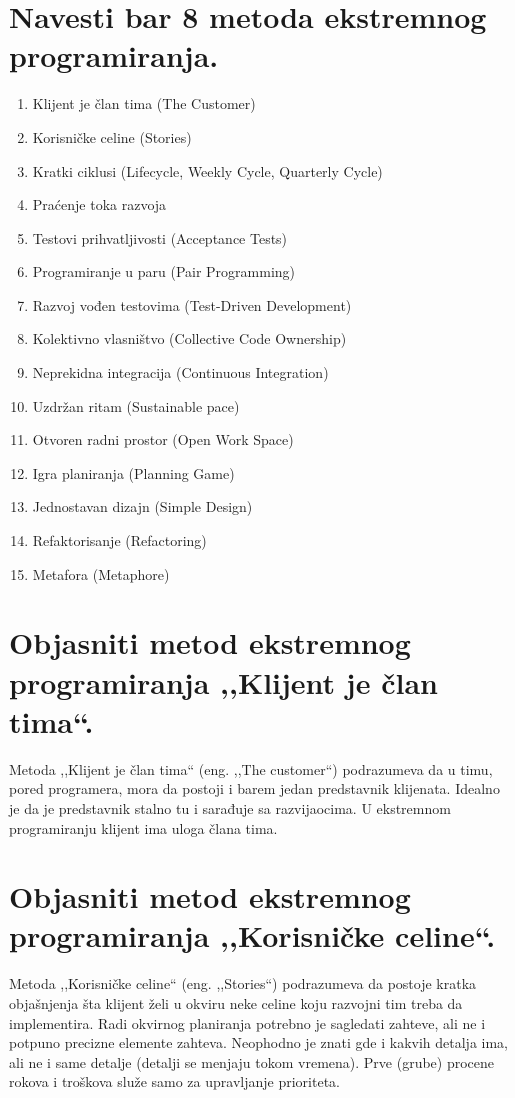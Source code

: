 \documentclass[a4paper]{article}
\begin{document}
\section{Navesti bar 8 metoda ekstremnog programiranja.}
  \begin{enumerate}
    \item Klijent je član tima (The Customer)
    \item Korisničke celine (Stories)
    \item Kratki ciklusi (Lifecycle, Weekly Cycle, Quarterly Cycle)
    \item Praćenje toka razvoja
    \item Testovi prihvatljivosti (Acceptance Tests)
    \item Programiranje u paru (Pair Programming)
    \item Razvoj vođen testovima (Test-Driven Development)
    \item Kolektivno vlasništvo (Collective Code Ownership)
    \item Neprekidna integracija (Continuous Integration)
    \item Uzdržan ritam (Sustainable pace)
    \item Otvoren radni prostor (Open Work Space)
    \item Igra planiranja (Planning Game)
    \item Jednostavan dizajn (Simple Design)
    \item Refaktorisanje (Refactoring)
    \item Metafora (Metaphore)\cite{aa_xp}\cite{ab_xp}
  \end{enumerate}

\section{Objasniti metod ekstremnog programiranja ,,Klijent je član tima``.}
  Metoda ,,Klijent je član tima`` (eng. ,,The customer``) podrazumeva da u timu,
  pored programera, mora da postoji i barem jedan predstavnik klijenata. Idealno je
  da je predstavnik stalno tu i sarađuje sa razvijaocima. U ekstremnom programiranju
  klijent ima uloga člana tima. 

\section{Objasniti metod ekstremnog programiranja ,,Korisničke celine``.}
  Metoda ,,Korisničke celine`` (eng. ,,Stories``) podrazumeva da postoje kratka objašnjenja
  šta klijent želi u okviru neke celine koju razvojni tim treba da implementira. Radi okvirnog
  planiranja potrebno je sagledati zahteve, ali ne i potpuno precizne elemente zahteva. Neophodno
  je znati gde i kakvih detalja ima, ali ne i same detalje (detalji se menjaju tokom vremena). 
  Prve (grube) procene rokova i troškova služe samo za upravljanje prioriteta. 
\end{document}
